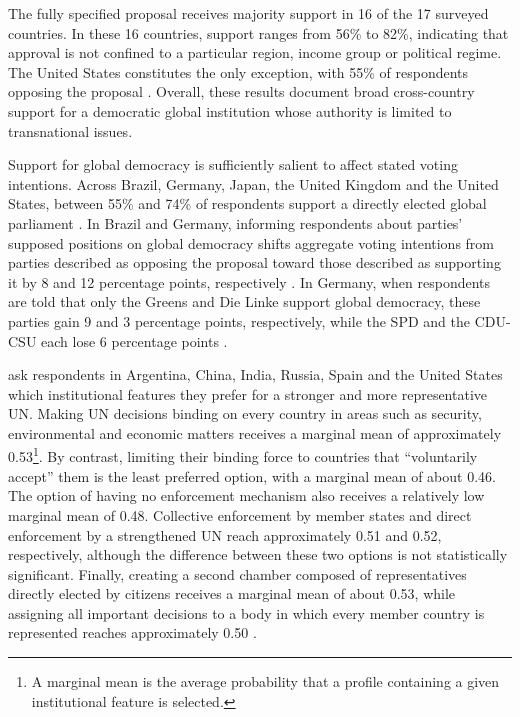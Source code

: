 The fully specified proposal receives majority support in 16 of the 17 surveyed countries. In these 16 countries, support ranges from 56\% to 82\%, indicating that approval is not confined to a particular region, income group or political regime. The United States constitutes the only exception, with 55\% of respondents opposing the proposal \citep[Figure 6]{ghassim_who_2024}. Overall, these results document broad cross-country support for a democratic global institution whose authority is limited to transnational issues.

Support for global democracy is sufficiently salient to affect stated voting intentions. Across Brazil, Germany, Japan, the United Kingdom and the United States, between 55\% and 74\% of respondents support a directly elected global parliament \citep[Figure 7]{ghassim_global_democracy_2020}. In Brazil and Germany, informing respondents about parties' supposed positions on global democracy shifts aggregate voting intentions from parties described as opposing the proposal toward those described as supporting it by 8 and 12 percentage points, respectively \citep[Figures 144--145]{ghassim_global_democracy_2020}. In Germany, when respondents are told that only the Greens and Die Linke support global democracy, these parties gain 9 and 3 percentage points, respectively, while the SPD and the CDU-CSU each lose 6 percentage points \citep[Figure 145]{ghassim_global_democracy_2020}.

\citet{ghassim_public_2022} ask respondents in Argentina, China, India, Russia, Spain and the United States which institutional features they prefer for a stronger and more representative UN. Making UN decisions binding on every country in areas such as security, environmental and economic matters receives a marginal mean of approximately 0.53\footnote{A marginal mean is the average probability that a profile containing a given institutional feature is selected.}. 
By contrast, limiting their binding force to countries that ``voluntarily accept'' them is the least preferred option, with a marginal mean of about 0.46. The option of having no enforcement mechanism also receives a relatively low marginal mean of 0.48. Collective enforcement by member states and direct enforcement by a strengthened UN reach approximately 0.51 and 0.52, respectively, although the difference between these two options is not statistically significant. Finally, creating a second chamber composed of representatives directly elected by citizens receives a marginal mean of about 0.53, %
while assigning all important decisions to a body in which every member country is represented reaches approximately 0.50 \citep[Figure 1]{ghassim_public_2022}.


